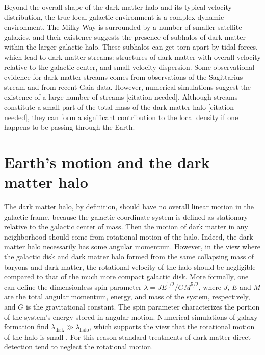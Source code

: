 \documentclass[b5paper, 10pt, twoside]{book}
\newcommand{\typographersred}{scp-red-dark-3}
\newcommand{\needcite}{\textcolor{\typographersred}{[citation needed]}}
\begin{document}
Beyond the overall shape of the dark matter halo and its typical velocity distribution, the true local galactic environment is a complex dynamic environment. The Milky Way is surrounded by a number of smaller satellite galaxies, and their existence suggests the presence of subhalos of dark matter within the larger galactic halo. These subhalos can get torn apart by tidal forces, which lead to dark matter streams: structures of dark matter with overall velocity relative to the galactic center, and small velocity dispersion. Some observational evidence for dark matter streams comes from observations of the Sagittarius stream \parencite{BelokurovEtAl2013} and from recent Gaia data\parencite{NecibLisantiBelokurov2019}. However, numerical simulations suggest the existence of a large number of streams \needcite. Although streams constitute a small part of the total mass of the dark matter halo \needcite, they can form a significant contribution to the local density if one happens to be passing through the Earth.

\section{Earth's motion and the dark matter halo}

The dark matter halo, by definition, should have no overall linear motion in the galactic frame, because the galactic coordinate system is defined as stationary relative to the galactic center of mass. Then the motion of dark matter in any neighborhood should come from rotational motion of the halo. Indeed, the dark matter halo necessarily has some angular momentum. However, in the view where the galactic disk and dark matter halo formed from the same collapsing mass of baryons and dark matter, the rotational velocity of the halo should be negligible compared to that of the much more compact galactic disk. More formally, one can define the dimensionless spin parameter $\lambda=JE^{1/2}/GM^{5/2}$, where $J$, $E$ and $M$ are the total angular momentum, energy, and mass of the system, respectively, and $G$ is the gravitational constant. The spin parameter characterizes the portion of the system's energy stored in angular motion. Numerical simulations of galaxy formation find $\lambda_\text{disk}\gg\lambda_\text{halo}$, which supports the view that the rotational motion of the halo is small \parencites{MoMaoWhite1998, WarrenEtAl1992, KimmEtAl2011}. For this reason standard treatments of dark matter direct detection tend to neglect the rotational motion.
\end{document}
